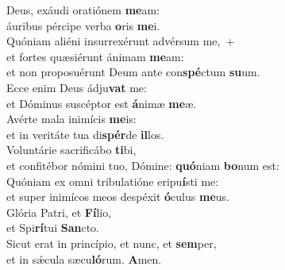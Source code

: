 \evenverse Deus, exáudi oratiónem \textbf{me}am:~\*\\
\evenverse áuribus pércipe verba \textbf{o}ris \textbf{me}i.\\
\oddverse Quóniam aliéni insurrexérunt advérsum me,~+\\
\oddverse  et fortes quæsiérunt ánimam \textbf{me}am:~\*\\
\oddverse et non proposuérunt Deum ante con\textbf{spé}ctum \textbf{su}um.\\
\evenverse Ecce enim Deus ádju\textbf{vat} me:~\*\\
\evenverse et Dóminus suscéptor est \textbf{á}nimæ \textbf{me}æ.\\
\oddverse Avérte mala inimícis \textbf{me}is:~\*\\
\oddverse et in veritáte tua di\textbf{spér}de \textbf{il}los.\\
\evenverse Voluntárie sacrificábo \textbf{ti}bi,~\*\\
\evenverse et confitébor nómini tuo, Dómine: \textbf{quó}niam \textbf{bo}num est:\\
\oddverse Quóniam ex omni tribulatióne eripu\textbf{í}sti me:~\*\\
\oddverse et super inimícos meos despéxit \textbf{ó}culus \textbf{me}us.\\
\evenverse Glória Patri, et \textbf{Fí}lio,~\*\\
\evenverse et Spi\textbf{rí}tui \textbf{San}cto.\\
\oddverse Sicut erat in princípio, et nunc, et \textbf{sem}per,~\*\\
\oddverse et in sǽcula sæcu\textbf{ló}rum. \textbf{A}men.\\
